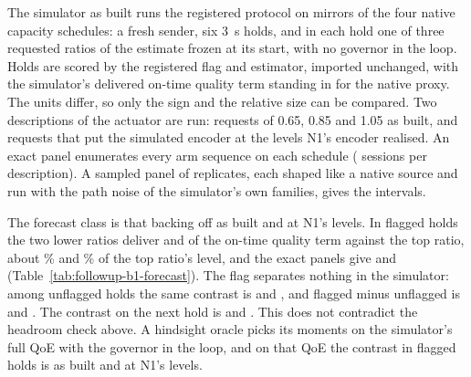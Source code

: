 The simulator as built runs the registered protocol on mirrors of the four native capacity schedules: a fresh sender, six 3~s holds, and in each hold one of three requested ratios of the estimate frozen at its start, with no governor in the loop. Holds are scored by the registered flag and estimator, imported unchanged, with the simulator's delivered on-time quality term standing in for the native proxy. The units differ, so only the sign and the relative size can be compared. Two descriptions of the actuator are run: requests of 0.65, 0.85 and 1.05 as built, and requests that put the simulated encoder at the levels N1's encoder realised. An exact panel enumerates every arm sequence on each schedule (\TypedCastBuiltSessions{} sessions per description). A sampled panel of \TypedCastReplicates{} replicates, each shaped like a native source and run with the path noise of the simulator's own families, gives the intervals.

\begin{table}[t]
\centering\small
\resizebox{\linewidth}{!}{}
\caption{Simulator forecast of the registered native test, beside what N1 measured. Arms are the requested ratios 0.65, 0.85 and 1.05 of the estimate. The upper block uses the exact panel and N1's published figures. The lower block is in units of the simulator's on-time quality term, with 95\% $t$ intervals over the sampled panel's replicates; its native column stays empty until the registered test is run.}
\label{tab:followup-b1-forecast}
\end{table}

The forecast class is that backing off \TypedCastBuiltClass{} as built and \TypedCastRealClass{} at N1's levels. In flagged holds the two lower ratios deliver \TypedCastBuiltMean{} \TypedCastBuiltInterval{} and \TypedCastRealMean{} \TypedCastRealInterval{} of the on-time quality term against the top ratio, about \TypedCastBuiltRelative\% and \TypedCastRealRelative\% of the top ratio's level, and the exact panels give \TypedCastBuiltExact{} and \TypedCastRealExact{} (Table~\ref{tab:followup-b1-forecast}). The flag separates nothing in the simulator: among unflagged holds the same contrast is \TypedCastBuiltOther{} and \TypedCastRealOther{}, and flagged minus unflagged is \TypedCastBuiltGap{} \TypedCastBuiltGapT{} and \TypedCastRealGap{} \TypedCastRealGapT{}. The contrast on the next hold is \TypedCastBuiltNext{} and \TypedCastRealNext{}. This does not contradict the headroom check above. A hindsight oracle picks its moments on the simulator's full QoE with the governor in the loop, and on that QoE the contrast in flagged holds is \TypedCastBuiltQoe{} \TypedCastBuiltQoeT{} as built and \TypedCastRealQoe{} \TypedCastRealQoeT{} at N1's levels.

